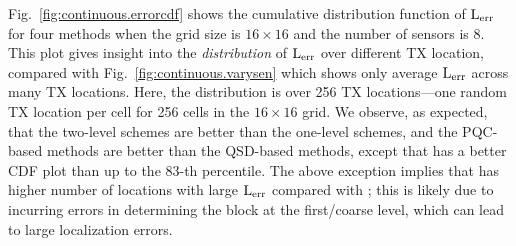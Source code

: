 Fig.~\ref{fig:continuous.errorcdf} shows the cumulative distribution function of $\mathrm{L_{err}}$ for four methods when the grid size is $16\times16$ and the number of sensors is 8.
This plot gives insight into the {\em distribution} of $\mathrm{L_{err}}$ over different TX location, 
compared with Fig.~\ref{fig:continuous.varysen} which shows only average $\mathrm{L_{err}}$ across many TX locations. 
Here, the distribution is over 256 TX locations---one random TX location per cell for 256 cells in the $16\times 16$ grid.
We observe, as expected, that  the two-level schemes are better than the one-level schemes, and the PQC-based methods are better than the QSD-based methods, except that \povm has a better CDF plot than
\pqcone up to the 83-th percentile. The above exception implies that \povm has higher number of locations with large $\mathrm{L_{err}}$ compared with \pqcone;
this is likely due to \povm incurring errors in determining the block at the first/coarse level, which can lead to large localization errors.







